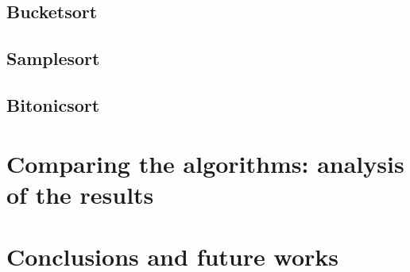 \documentclass[a4paper,12pt,oneside,openright]{article}
\begin{document}
\subsection{Bucketsort}
\subsection{Samplesort}
\subsection{Bitonicsort}


\section{Comparing the algorithms: analysis of the results}

\section{Conclusions and future works}


                                                                    

%



\pagebreak

\begin{thebibliography}{13}
\end{thebibliography}
\end{document}
